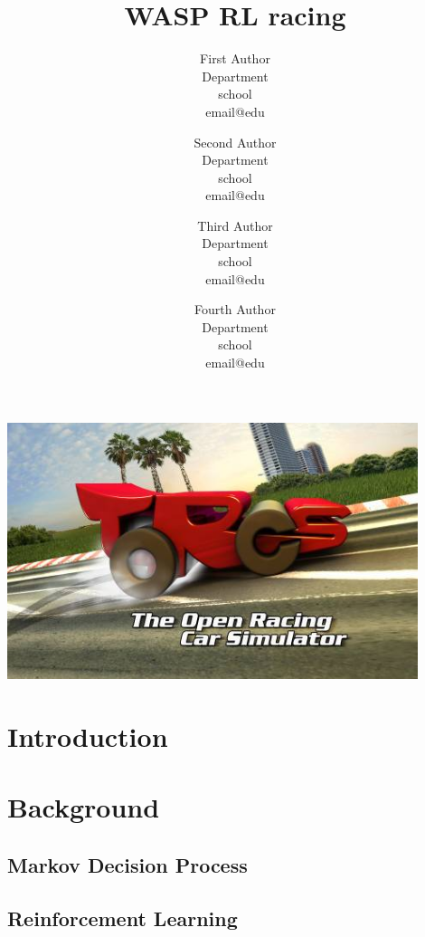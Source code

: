 \documentclass{article}
\begin{document}
\title{WASP RL racing}
\author{
	First Author\\
	Department\\
	school\\
	email@edu
	\and
	Second Author\\
	Department\\
	school\\
	email@edu
	\and
	Third Author\\
	Department\\
	school\\
	email@edu
	\and
	Fourth Author\\
	Department\\
	school\\
	email@edu
}

\maketitle
\thispagestyle{empty}
\includegraphics[width=12cm]{img/torcs.png} %
\clearpage
\tableofcontents
\clearpage
\section{Introduction}
\setcounter{page}{1}

\section{Background}

\subsection{Markov Decision Process}

\subsection{Reinforcement Learning}
\end{document}

